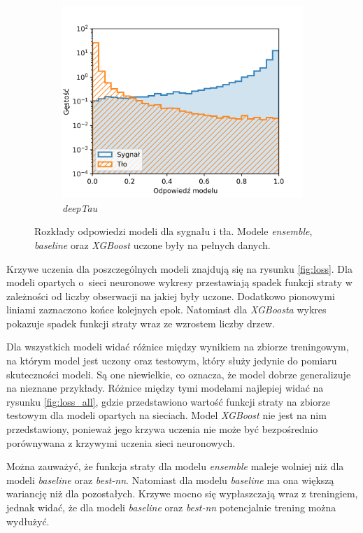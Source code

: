 \documentclass{pracalicmgr}
\begin{document}
\begin{figure}[H]
\begin{subfigure}{.5\textwidth}
	\includegraphics[width=1\textwidth]{density_deepTau.png}
	\caption{\textit{deepTau}}
	\end{subfigure}
	\caption{Rozkłady odpowiedzi modeli dla sygnału i tła. Modele \textit{ensemble}, \textit{baseline} oraz \textit{XGBoost} uczone były na pełnych danych.}
	\label{fig:dist}
	\end{figure}
	\newpage
	Krzywe uczenia dla poszczególnych modeli znajdują się na rysunku \ref{fig:loss}. Dla modeli opartych o~sieci neuronowe wykresy przestawiają spadek funkcji straty w zależności od liczby obserwacji na jakiej były uczone. Dodatkowo pionowymi liniami zaznaczono końce kolejnych epok. Natomiast dla \textit{XGBoosta} wykres pokazuje spadek funkcji straty wraz ze wzrostem liczby drzew.
	
	Dla wszystkich modeli widać różnice między wynikiem na zbiorze treningowym, na którym model jest uczony oraz testowym, który służy jedynie do pomiaru skuteczności modeli. Są one niewielkie, co oznacza, że model dobrze generalizuje na nieznane przykłady. Różnice między tymi modelami najlepiej widać na rysunku \ref{fig:loss_all}, gdzie przedstawiono wartość funkcji straty na zbiorze testowym dla modeli opartych na sieciach. Model \textit{XGBoost} nie jest na nim przedstawiony, ponieważ jego krzywa uczenia nie może być bezpośrednio porównywana z krzywymi uczenia sieci neuronowych. 
	
	Można zauważyć, że funkcja straty dla modelu \textit{ensemble} maleje wolniej niż dla modeli \textit{baseline} oraz \textit{best-nn}. Natomiast dla modelu \textit{baseline} ma ona większą wariancję niż dla pozostałych. Krzywe mocno się wypłaszczają wraz z treningiem, jednak widać, że dla modeli \textit{baseline} oraz \textit{best-nn} potencjalnie trening można wydłużyć.
	
\end{document}

